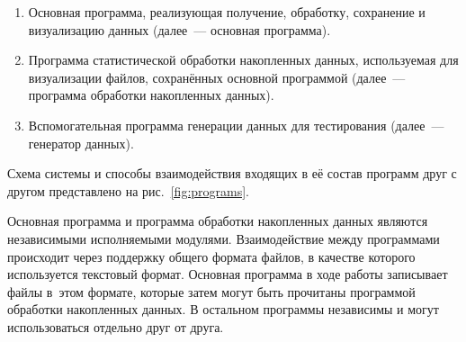 \documentclass[a4paper, 14pt, titlepage]{extarticle}
\newenvironment{myfigure}[2]%
    {\pushQED{\caption{#1} \label{#2}} %
     \begin{figure}[!htb]\centering } %
    {  \popQED %
     \end{figure}}
\begin{document}
  \begin{enumerate}
    \item Основная программа, реализующая получение, обработку, сохранение и визуализацию данных
      (далее~--- основная программа).
    \item Программа статистической обработки накопленных данных, используемая для визуализации
      файлов, сохранённых основной программой (далее~--- программа обработки накопленных данных).
    \item Вспомогательная программа генерации данных для тестирования
      (далее~--- генератор данных).
  \end{enumerate}

  Схема системы и способы взаимодействия входящих в её состав программ друг с другом представлено на
  рис.~\ref{fig:programs}.

  \begin{myfigure}{Программы, входящие в состав системы}{fig:programs}
  \end{myfigure}

  Основная программа и программа обработки накопленных данных являются независимыми исполняемыми
  модулями. Взаимодействие между программами происходит через поддержку общего формата файлов, в
  качестве которого используется текстовый формат.
  Основная программа в ходе работы записывает файлы в~этом формате, которые затем могут быть прочитаны
  программой обработки накопленных данных. В остальном программы независимы и могут использоваться
  отдельно друг от друга.
\end{document}
